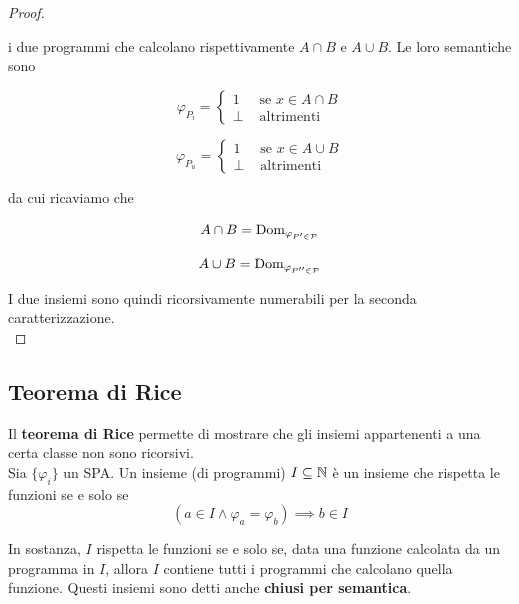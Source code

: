 \begin{proof}
\begin{center}
\begin{minipage}{.45\textwidth}
\begin{tcolorbox}[
				colback=white,
				sharp corners,
				boxrule=.3mm,
				left=20pt,
				top=0pt,
				bottom=0pt,
				title=$P_u$,
				colbacktitle=white,
				coltitle=black
				]
			\end{tcolorbox}
		\end{minipage}
	\end{center}
	i due programmi che calcolano rispettivamente $A \cap B$ e $A \cup B$. Le loro semantiche sono
	\begin{center}
		\begin{minipage}{0.45\textwidth}
			$$ \varphi_{P_i} = \begin{cases}
				1 & \text{ se } x \in A \cap B \\
				\bot & \text{ altrimenti}
			\end{cases}$$
		\end{minipage}
		\begin{minipage}{0.45\textwidth}
			$$ \varphi_{P_u} = \begin{cases}
				1 & \text{ se } x \in A \cup B\\
				\bot & \text{ altrimenti}
			\end{cases}$$
		\end{minipage}
	\end{center}
	da cui ricaviamo che
	\begin{center}
		\begin{minipage}{0.45\textwidth}
			$$ A \cap B = \text{Dom}_{\varphi_{P' \in \mathcal{P}}}$$
		\end{minipage}
		\begin{minipage}{0.45\textwidth}
			$$ A \cup B = \text{Dom}_{\varphi_{P'' \in \mathcal{P}}}$$
		\end{minipage}
	\end{center}
	I due insiemi sono quindi ricorsivamente numerabili per la seconda caratterizzazione.\\
\end{proof}

\subsection{Teorema di Rice}

Il \textbf{teorema di Rice} permette di mostrare che gli insiemi appartenenti a una certa classe non sono ricorsivi.\\

Sia $\{\varphi_i\}$ un SPA. Un insieme (di programmi) $I \subseteq \mathbb{N}$ è un insieme che rispetta le funzioni se e solo se
$$ \left(a \in I \wedge \varphi_a = \varphi_b \right) \implies b \in I $$

In sostanza, $I$ rispetta le funzioni se e solo se, data una funzione calcolata da un programma in $I$, allora $I$ contiene tutti i programmi che calcolano quella funzione. Questi insiemi sono detti anche \textbf{chiusi per semantica}.\\

